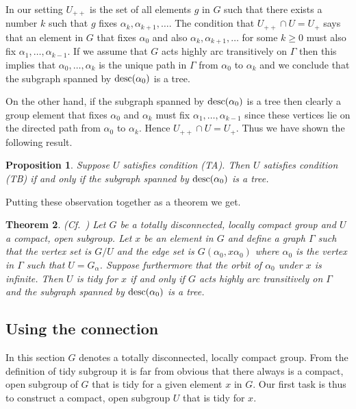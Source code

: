 \documentclass{emsprocart}
\newtheorem{theorem}{Theorem}[section]
\newtheorem{proposition}[theorem]{Proposition}
\theoremstyle{definition}
\begin{document}
In our setting $U_{++}$ is the set of all elements $g$ in $G$ such that
there exists a number $k$ such that $g$ fixes $\alpha_k,
\alpha_{k+1},\ldots$.  The condition that $U_{++}\cap U=U_+$ says that
an element in $G$ that fixes $\alpha_0$ and also $\alpha_k,
\alpha_{k+1}, \ldots$ for some $k\geq 0$ must also fix $\alpha_1,
\ldots, \alpha_{k-1}$.  If we assume that $G$ acts highly arc
transitively on $\Gamma$ then this implies that $\alpha_0, \ldots,
\alpha_k$ is the unique path in $\Gamma$ from $\alpha_0$ to
$\alpha_k$ and we conclude that the subgraph spanned by
${\mbox{${\rm desc}$}}(\alpha_0)$ is a tree.

On the other hand, if the subgraph spanned
by ${\mbox{${\rm desc}$}}(\alpha_0)$ is a tree then clearly a group element that fixes
$\alpha_0$ and $\alpha_k$ must fix $\alpha_1,
\ldots, \alpha_{k-1}$ since these vertices lie on the directed
path from $\alpha_0$ to $\alpha_k$.  Hence  $U_{++}\cap U=U_+$.
Thus we have shown the following result.

\begin{proposition}
Suppose $U$ satisfies condition (TA).  Then $U$ satisfies condition (TB)
if and only if the subgraph spanned by ${\mbox{${\rm desc}$}}(\alpha_0)$ is a tree.
\end{proposition}

Putting these observation together as a theorem we get.

\begin{theorem}
 {\rm (Cf.~\cite[Theorem~3.4]{Moller2002})}
Let $G$ be a totally disconnected, locally compact group and $U$ a
compact, open subgroup.  Let $x$ be an element in $G$ and define a
graph $\Gamma$ such that the vertex set is $G/U$ and the edge set is
$G(\alpha_0, x\alpha_0)$ where $\alpha_0$ is the vertex in $\Gamma$ such
that $U=G_\alpha$.  Suppose furthermore that the orbit of $\alpha_0$ under $x$ is infinite.  Then $U$ is tidy for $x$ if and only if $G$ acts
highly arc transitively on $\Gamma$ and the subgraph spanned by
${\mbox{${\rm desc}$}}(\alpha_0)$ is a tree.
\end{theorem}

\subsection{Using the connection}
In this section $G$ denotes a totally disconnected, locally compact group.
From the definition of tidy subgroup it is far from obvious that there
always is a compact, open subgroup of $G$ that is tidy for a given
element $x$ in $G$.  Our first task is thus to construct
a compact, open subgroup $U$ that is tidy for $x$.
\end{document}

